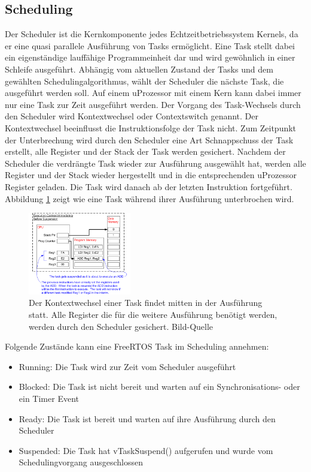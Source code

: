 \subsection{Scheduling}
\label{Scheduling}
Der Scheduler ist die Kernkomponente jedes Echtzeitbetriebssystem Kernels, da er eine quasi parallele Aus\-füh\-rung von Tasks ermöglicht. Eine Task stellt dabei ein ei\-gen\-stän\-di\-ge lauffähige Programmeinheit dar und wird ge\-wöhn\-lich in einer Schleife ausgeführt. Abhängig vom aktuellen Zustand der Tasks und dem gewählten Schedulingalgorithmus, wählt der Scheduler die nächste Task, die ausgeführt werden soll. Auf einem uProzessor mit einem Kern kann dabei immer nur eine Task zur Zeit ausgeführt werden. Der Vorgang des Task-Wechsels durch den Scheduler wird Kontextwechsel oder Contextswitch genannt. Der Kontextwechsel beeinflusst die Instruktionsfolge der Task nicht. Zum Zeitpunkt der Unterbrechung wird durch den Scheduler eine Art Schnappschuss der Task erstellt, alle Register und der Stack der Task werden gesichert. Nachdem der Scheduler die verdrängte Task wieder zur Ausführung ausgewählt hat, werden alle Register und der Stack wieder hergestellt und in die entsprechenden uProzessor Register geladen. Die Task wird danach ab der letzten Instruktion fortgeführt. Abbildung \ref{fig:ContextSwitch} zeigt wie eine Task während ihrer Ausführung unterbrochen wird.
\begin{figure}[ht!]
	\centering
		\includegraphics[width=0.4\textwidth]{Pictures/FreeRTOSOrg/ExeContext.png}
	\caption{Der Kontextwechsel einer Task findet mitten in der Ausführung statt. Alle Register die für die weitere Ausführung benötigt werden, werden durch den Scheduler gesichert. Bild-Quelle~\protect{} }
	\label{fig:ContextSwitch}
\end{figure}   
Folgende Zu\-stän\-de kann eine FreeRTOS Task im Scheduling annehmen: 
\begin{itemize}
	\item Running: Die Task wird zur Zeit vom Scheduler ausgeführt
	\item Blocked: Die Task ist nicht bereit und warten auf ein Synchronisations- oder ein Timer Event
	\item Ready: Die Task ist bereit und warten auf ihre Aus\-füh\-rung durch den Scheduler
	\item Suspended: Die Task hat vTaskSuspend() aufgerufen und wurde vom Schedulingvorgang ausgeschlossen
\end{itemize}

